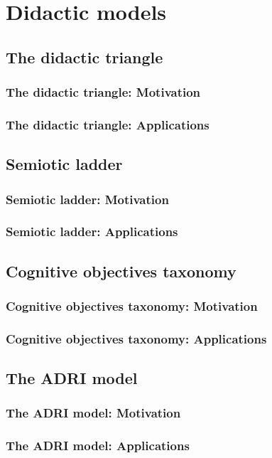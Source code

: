 \chapter{Didactic models}

\section{The didactic triangle}
\subsection{The didactic triangle: Motivation}
\subsection{The didactic triangle: Applications}

\section{Semiotic ladder}
\subsection{Semiotic ladder: Motivation}
\subsection{Semiotic ladder: Applications}

\section{Cognitive objectives taxonomy}
\subsection{Cognitive objectives taxonomy: Motivation}
\subsection{Cognitive objectives taxonomy: Applications}

\section{The ADRI model}
\subsection{The ADRI model: Motivation}
\subsection{The ADRI model: Applications}